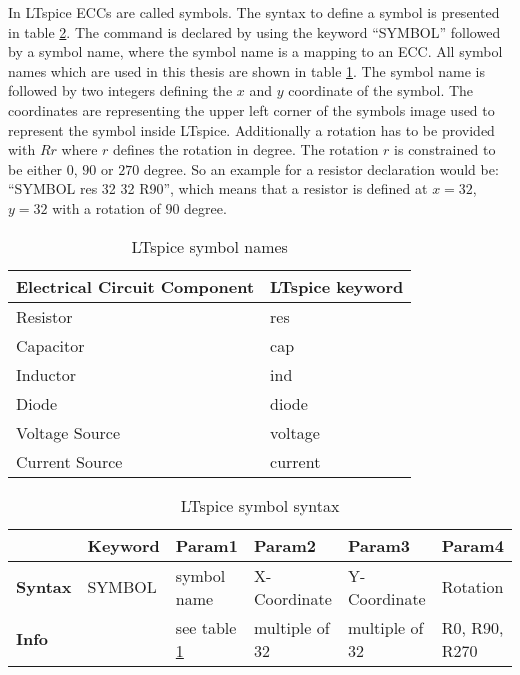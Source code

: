 In LTspice \acp{ECC} are called symbols.
The syntax to define a symbol is presented in table \ref{tab:ltsymbol_syntax}.
The command is declared by using the keyword ``SYMBOL'' followed by a symbol name, where the symbol name is a mapping to an \ac{ECC}.
All symbol names which are used in this thesis are shown in table \ref{tab:ltsymbol_mapping}.
The symbol name is followed by two integers defining the $x$ and $y$ coordinate of the symbol.
The coordinates are representing the upper left corner of the symbols image used to represent the symbol inside LTspice.
Additionally a rotation has to be provided with $Rr$ where $r$ defines the rotation in degree.
The rotation $r$ is constrained to be either $0$, $90$ or $270$ degree.
So an example for a resistor declaration would be: ``SYMBOL res 32 32 R90'', which means that a resistor is defined at $x = 32$, $y = 32$ with a rotation of $90$ degree.

\begin{table}[H]
\begin{center}

\begin{tabular}{l|l}
    \textbf{Electrical Circuit Component} & \textbf{LTspice keyword}\\
    \hline
    Resistor & res\\
    Capacitor & cap\\
    Inductor & ind\\
    Diode & diode\\
    Voltage Source & voltage\\
    Current Source & current
\end{tabular}
\caption{LTspice symbol names}
\label{tab:ltsymbol_mapping}

\end{center}
\end{table}

\begin{table}[H]
\begin{center}

\begin{tabular}{l|l|l|l|l|l}
    & \textbf{Keyword} & \textbf{Param1} & \textbf{Param2} & \textbf{Param3} & \textbf{Param4}\\
    \hline
    \textbf{Syntax} & SYMBOL & symbol name & X-Coordinate & Y-Coordinate & Rotation\\
    \textbf{Info} & & see table \ref{tab:ltsymbol_mapping} & multiple of 32 & multiple of 32 & R0, R90, R270
\end{tabular}
\caption{LTspice symbol syntax}
\label{tab:ltsymbol_syntax}

\end{center}
\end{table}

